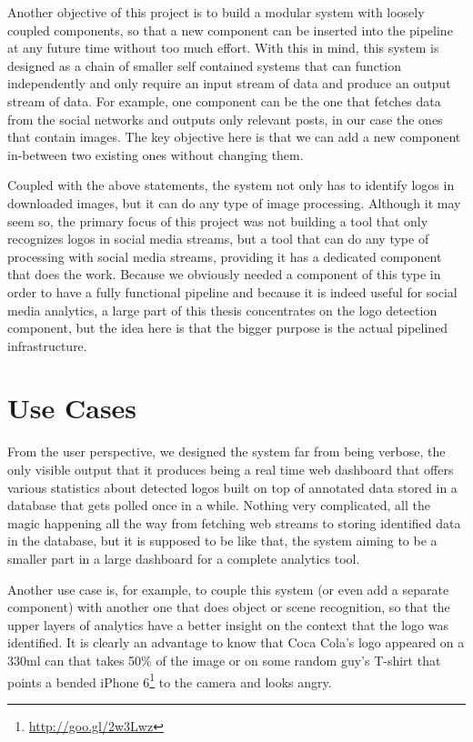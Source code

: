 Another objective of this project is to build a modular system with loosely
coupled components, so that a new component can be inserted into the pipeline
at any future time without too much effort. With this in mind, this system is
designed as a chain of smaller self contained systems that can function
independently and only require an input stream of data and produce
an output stream of data. For example, one component can be the one that
fetches data from the social networks and outputs only relevant posts, in our
case the ones that contain images. The key objective here is that we can add
a new component in-between two existing ones without changing them.

Coupled with the above statements, the system not only has to identify logos
in downloaded images, but it can do any type of image processing. Although it
may seem so, the primary focus of this project was not building a tool that
only recognizes logos in social media streams, but a tool that can do any type
of processing with social media streams, providing it has a dedicated
component that does the work. Because we obviously needed a component of this type
in order to have a fully functional pipeline and because it is indeed useful
for social media analytics, a large part of this thesis concentrates on the
logo detection component, but the idea here is that the bigger purpose is the
actual pipelined infrastructure.

\section{Use Cases}
\label{sec:proj-use-cases}

From the user perspective, we designed the system far from being verbose,
the only visible output that it produces being a real time web dashboard that
offers various statistics about detected logos built on top of annotated data
stored in a database that gets polled once in a while. Nothing very
complicated, all the magic happening all the way from fetching web streams to
storing identified data in the database, but it is supposed to be like that,
the system aiming to be a smaller part in a large dashboard for a complete
analytics tool. 

Another use case is, for example, to couple this system (or even add a
separate component) with another one that does object or scene recognition, so
that the upper layers of analytics have a better insight on the context that
the logo was identified. It is clearly an advantage to know that Coca Cola's
logo appeared on a 330ml can that takes 50\% of the image or on some random
guy's T-shirt that points a bended iPhone 6\footnote{\url{http://goo.gl/2w3Lwz}}
to the camera and looks angry.

